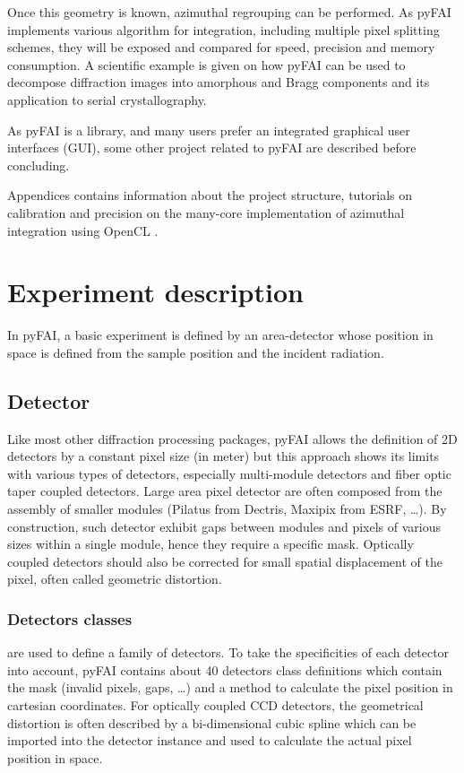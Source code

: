 \documentclass[preprint]{iucr}
\begin{document}
Once this geometry is known, azimuthal regrouping can be performed. 
As pyFAI implements various algorithm for integration, including 
multiple pixel splitting schemes, they will be exposed and compared
for speed, precision and memory consumption.
A scientific example is given on how pyFAI can be used to decompose 
diffraction images into amorphous and Bragg components and its application
to serial crystallography.

As pyFAI is a library, and many users prefer an integrated graphical user
interfaces (GUI), some other project related to pyFAI are described before
concluding.

Appendices contains information about the project structure, tutorials on
calibration and precision on the many-core implementation of azimuthal
integration using OpenCL \cite{opencl}.
 
\section{Experiment description}
In pyFAI, a basic experiment is defined by an area-detector whose position
in space is defined from the sample position and the incident radiation.

\subsection{Detector}
Like most other diffraction processing packages, pyFAI allows the definition of
2D detectors by a constant pixel size (in meter) but this approach shows its limits
with various types of detectors, especially multi-module detectors and fiber
optic taper coupled detectors. Large area pixel detector are often composed from
the assembly of smaller modules (Pilatus from Dectris, Maxipix from ESRF, \ldots). 
By construction, such detector exhibit gaps between modules and pixels of
various sizes within a single module, hence they require a specific mask.
Optically coupled detectors should also be corrected
for small spatial displacement of the pixel, often called geometric distortion.

\subsubsection{Detectors classes} are used to define a family of detectors. 
To take the specificities of each detector into account, pyFAI contains about
40 detectors class definitions which contain the mask (invalid pixels,
gaps, \ldots) and a method to calculate the pixel position in cartesian coordinates.
For optically coupled CCD detectors, the geometrical distortion is often
described by a bi-dimensional cubic spline which can be imported into
the detector instance and used to calculate the actual pixel position in space.
\end{document}
